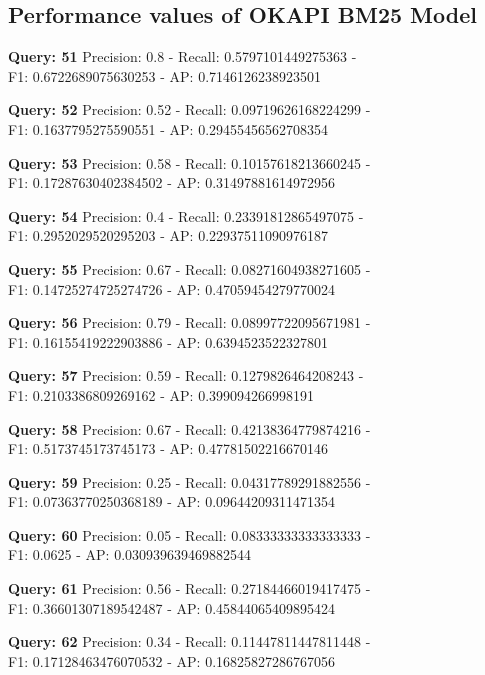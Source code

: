 \documentclass[a4paper, 11pt]{article}
\begin{document}
\subsection{Performance values of OKAPI BM25 Model}
\textbf{Query: 51}
Precision: 0.8 - Recall: 0.5797101449275363 - \\
F1: 0.6722689075630253 - AP: 0.7146126238923501

\textbf{Query: 52}
Precision: 0.52 - Recall: 0.09719626168224299 - \\
F1: 0.1637795275590551 - AP: 0.29455456562708354

\textbf{Query: 53}
Precision: 0.58 - Recall: 0.10157618213660245 - \\
F1: 0.17287630402384502 - AP: 0.31497881614972956

\textbf{Query: 54}
Precision: 0.4 - Recall: 0.23391812865497075 - \\
F1: 0.2952029520295203 - AP: 0.22937511090976187

\textbf{Query: 55}
Precision: 0.67 - Recall: 0.08271604938271605 - \\
F1: 0.14725274725274726 - AP: 0.47059454279770024

\textbf{Query: 56}
Precision: 0.79 - Recall: 0.08997722095671981 - \\
F1: 0.16155419222903886 - AP: 0.6394523522327801

\textbf{Query: 57}
Precision: 0.59 - Recall: 0.1279826464208243 - \\
F1: 0.2103386809269162 - AP: 0.399094266998191

\textbf{Query: 58}
Precision: 0.67 - Recall: 0.42138364779874216 - \\
F1: 0.5173745173745173 - AP: 0.47781502216670146

\textbf{Query: 59}
Precision: 0.25 - Recall: 0.04317789291882556 - \\
F1: 0.07363770250368189 - AP: 0.09644209311471354

\textbf{Query: 60}
Precision: 0.05 - Recall: 0.08333333333333333 - \\
F1: 0.0625 - AP:  0.030939639469882544

\textbf{Query: 61}
Precision: 0.56 - Recall: 0.27184466019417475 - \\
F1: 0.36601307189542487 - AP: 0.45844065409895424

\textbf{Query: 62}
Precision: 0.34 - Recall: 0.11447811447811448 - \\
F1: 0.17128463476070532 - AP:  0.16825827286767056
\end{document}
